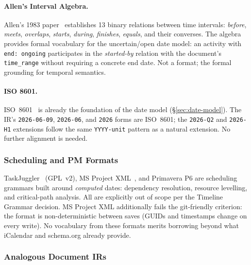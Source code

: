 \paragraph{Allen's Interval Algebra.}
Allen's 1983 paper~\cite{allen1983} establishes 13 binary relations between
time intervals: \emph{before}, \emph{meets}, \emph{overlaps}, \emph{starts},
\emph{during}, \emph{finishes}, \emph{equals}, and their converses. The
algebra provides formal vocabulary for the uncertain/open date model: an
activity with \texttt{end: ongoing} participates in the \emph{started-by}
relation with the document's \texttt{time\_range} without requiring a concrete
end date. Not a format; the formal grounding for temporal semantics.

\paragraph{ISO 8601.}
ISO~8601~\cite{iso8601} is already the foundation of the date model
(\S\ref{sec:date-model}). The IR's \texttt{2026-06-09}, \texttt{2026-06}, and
\texttt{2026} forms are ISO~8601; the \texttt{2026-Q2} and \texttt{2026-H1}
extensions follow the same \texttt{YYYY-unit} pattern as a natural extension.
No further alignment is needed.

\subsubsection{Scheduling and PM Formats}

TaskJuggler~\cite{taskjuggler} (GPL~v2), MS Project XML~\cite{msprojectxml},
and Primavera P6 are scheduling grammars built around \emph{computed} dates:
dependency resolution, resource levelling, and critical-path analysis. All are
explicitly out of scope per the Timeline Grammar decision. MS Project XML
additionally fails the git-friendly criterion: the format is non-deterministic
between saves (GUIDs and timestamps change on every write). No vocabulary from
these formats merits borrowing beyond what iCalendar and schema.org already
provide.

\subsubsection{Analogous Document IRs}

